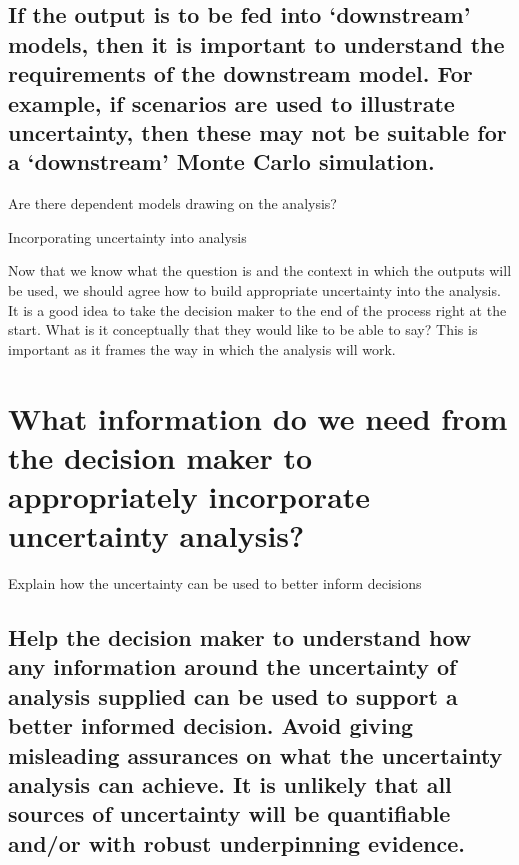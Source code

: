 \documentclass[]{book}
\begin{document}
\subsection{\texorpdfstring{If the output is to be fed into `downstream'
models, then it is important to understand the requirements of the
downstream model. For example, if scenarios are used to illustrate
uncertainty, then these may not be suitable for a `downstream' Monte
Carlo
simulation.}{If the output is to be fed into downstream models, then it is important to understand the requirements of the downstream model. For example, if scenarios are used to illustrate uncertainty, then these may not be suitable for a downstream Monte Carlo simulation.}}\label{if-the-output-is-to-be-fed-into-downstream-models-then-it-is-important-to-understand-the-requirements-of-the-downstream-model.-for-example-if-scenarios-are-used-to-illustrate-uncertainty-then-these-may-not-be-suitable-for-a-downstream-monte-carlo-simulation.}

 Are there dependent models drawing on the analysis?

Incorporating uncertainty into analysis

 Now that we know what the question is and the context in which the
outputs will be used, we should agree how to build appropriate
uncertainty into the analysis. It is a good idea to take the decision
maker to the end of the process right at the start. What is it
conceptually that they would like to be able to say? This is important
as it frames the way in which the analysis will work.

\section{What information do we need from the decision maker to
appropriately incorporate uncertainty
analysis?}\label{what-information-do-we-need-from-the-decision-maker-to-appropriately-incorporate-uncertainty-analysis}

 Explain how the uncertainty can be used to better inform decisions

\subsection{Help the decision maker to understand how any information
around the uncertainty of analysis supplied can be used to support a
better informed decision. Avoid giving misleading assurances on what the
uncertainty analysis can achieve. It is unlikely that all sources of
uncertainty will be quantifiable and/or with robust underpinning
evidence.}\label{help-the-decision-maker-to-understand-how-any-information-around-the-uncertainty-of-analysis-supplied-can-be-used-to-support-a-better-informed-decision.-avoid-giving-misleading-assurances-on-what-the-uncertainty-analysis-can-achieve.-it-is-unlikely-that-all-sources-of-uncertainty-will-be-quantifiable-andor-with-robust-underpinning-evidence.}
\end{document}
